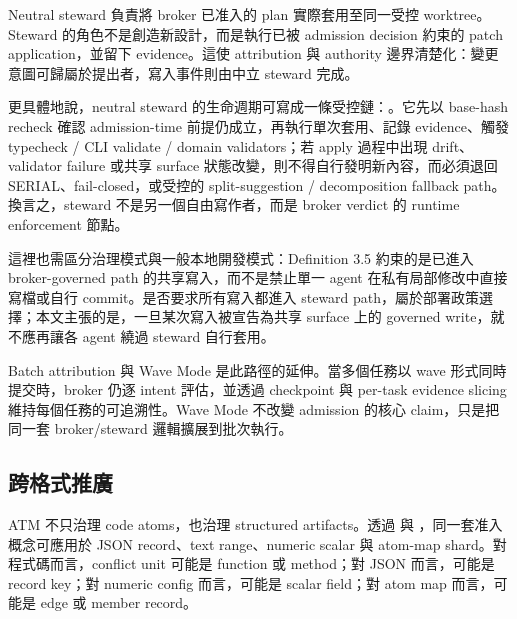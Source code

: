\documentclass[a4paper,fontset=none]{ctexart}
\begin{document}
Neutral steward 負責將 broker 已准入的 plan 實際套用至同一受控 worktree。Steward 的角色不是創造新設計，而是執行已被 admission decision 約束的 patch application，並留下 evidence。這使 attribution 與 authority 邊界清楚化：變更意圖可歸屬於提出者，寫入事件則由中立 steward 完成。

更具體地說，neutral steward 的生命週期可寫成一條受控鏈：\texttt{}。它先以 base-hash recheck 確認 admission-time 前提仍成立，再執行單次套用、記錄 evidence、觸發 typecheck / CLI validate / domain validators；若 apply 過程中出現 drift、validator failure 或共享 surface 狀態改變，則不得自行發明新內容，而必須退回 SERIAL、fail-closed，或受控的 split-suggestion / decomposition fallback path。換言之，steward 不是另一個自由寫作者，而是 broker verdict 的 runtime enforcement 節點。

這裡也需區分治理模式與一般本地開發模式：Definition 3.5 約束的是已進入 broker-governed path 的共享寫入，而不是禁止單一 agent 在私有局部修改中直接寫檔或自行 commit。是否要求所有寫入都進入 steward path，屬於部署政策選擇；本文主張的是，一旦某次寫入被宣告為共享 surface 上的 governed write，就不應再讓各 agent 繞過 steward 自行套用。

Batch attribution 與 Wave Mode 是此路徑的延伸。當多個任務以 wave 形式同時提交時，broker 仍逐 intent 評估，並透過 checkpoint 與 per-task evidence slicing 維持每個任務的可追溯性。Wave Mode 不改變 admission 的核心 claim，只是把同一套 broker/steward 邏輯擴展到批次執行。

\subsection{跨格式推廣}

ATM 不只治理 code atoms，也治理 structured artifacts。透過 \texttt{} 與 \texttt{}，同一套准入概念可應用於 JSON record、text range、numeric scalar 與 atom-map shard。對程式碼而言，conflict unit 可能是 function 或 method；對 JSON 而言，可能是 record key；對 numeric config 而言，可能是 scalar field；對 atom map 而言，可能是 edge 或 member record。

\smallskip{}\par\smallskip
\end{document}
